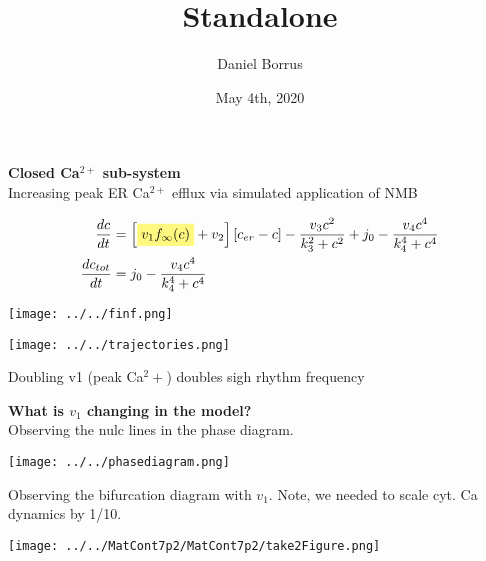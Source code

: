 \documentclass[11pt,margin=1cm,varwidth]{standalone}	%
\title{Standalone}
\date{May 4th, 2020}
\author{Daniel Borrus}
\newcommand{\highlight}[1]{%
	\colorbox{yellow!50}{$\displaystyle#1$}}
\begin{document}
	

	{ \bf Closed Ca$^{2+}$ sub-system} \\
	Increasing peak ER Ca$^{2+}$ efflux via simulated application of NMB 

	\begin{center}
	
	\begin{align*}
	\frac{dc}{dt} &= \left[ \highlight{v_1 f_\infty(c)} + v_2 \right] \left[ c_{er} - c \right] - \frac{v_3 c^2}{k^2_3+c^2} + j_0 - \frac{v_4c^4}{k^4_4 + c^4}\\
	\frac{dc_{tot}}{dt} &= j_0 - \frac{v_4c^4}{k^4_4 + c^4}
	\end{align*}
	
	\texttt{[image: ../../finf.png]}
	
	\texttt{[image: ../../trajectories.png]}



	\end{center}

	Doubling v1 (peak Ca${^2+}$) doubles sigh rhythm frequency
	
	\vskip10mm
	
	{ \bf What is $v_1$ changing in the model?} \\
	Observing the nulc lines in the phase diagram. 
	
	\begin{center}
		\texttt{[image: ../../phasediagram.png]}
	\end{center}
	Observing the bifurcation diagram with $v_1$. Note, we needed to scale cyt. Ca dynamics by 1/10.
	\begin{center}
		\texttt{[image: ../../MatCont7p2/MatCont7p2/take2Figure.png]}
	
	\end{center}
	
\end{document}
